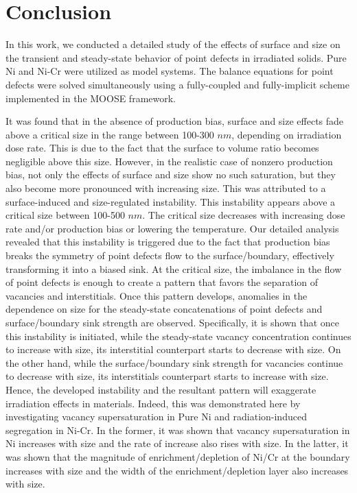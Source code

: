 \documentclass[utf8]{frontiersSCNS} %
\begin{document}
\clearpage
\section{Conclusion}

In this work, we conducted a detailed study of the effects of surface and size on the transient and steady-state behavior of point defects in irradiated solids. Pure Ni and Ni-Cr were utilized as model systems. The balance equations for point defects were solved simultaneously using a fully-coupled and fully-implicit scheme implemented in the MOOSE framework.    

It was found that in the absence of production bias, surface and size effects fade above a critical size in the range between 100-300 $nm$, depending on irradiation dose rate. This is due to the fact that the surface to volume ratio becomes negligible above this size. However, in the realistic case of nonzero production bias, not only the effects of surface and size show no such saturation, but they also become more pronounced with increasing size. This was attributed to a surface-induced and size-regulated instability. This instability appears above a critical size between 100-500 $nm$. The critical size decreases with increasing dose rate and/or production bias or lowering the temperature. Our detailed analysis revealed that this instability is triggered due to the fact that production bias breaks the symmetry of point defects flow to the surface/boundary, effectively transforming it into a biased sink. At the critical size, the imbalance in the flow of point defects is enough to create a pattern that favors the separation of vacancies and interstitials. Once this pattern develops, anomalies in the dependence on size for the steady-state concatenations of point defects and surface/boundary sink strength are observed. Specifically, it is shown that once this instability is initiated, while the steady-state vacancy concentration continues to increase with size, its interstitial counterpart starts to decrease with size. On the other hand, while the surface/boundary sink strength for vacancies continue to decrease with size, its interstitials counterpart starts to increase with size. Hence, the developed instability and the resultant pattern will exaggerate irradiation effects in materials. Indeed, this was demonstrated here by investigating vacancy supersaturation in Pure Ni and radiation-induced segregation in Ni-Cr. In the former, it was shown that vacancy supersaturation in Ni increases with size and the rate of increase also rises with size. In the latter, it was shown that the magnitude of enrichment/depletion of Ni/Cr at the boundary increases with size and the width of the enrichment/depletion layer also increases with size.
\end{document}
